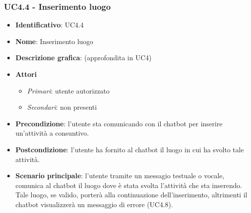 \subsubsection{UC4.4 - Inserimento luogo }
\begin{itemize}
    \item \textbf{Identificativo}: UC4.4
    \item \textbf{Nome}: Inserimento luogo   
    \item \textbf{Descrizione grafica}: (approfondita in UC4)
    \item \textbf{Attori}
        \begin{itemize} 
            \item \textit{Primari}: utente autorizzato
            \item \textit{Secondari}: non presenti
        \end{itemize}
    \item \textbf{Precondizione}: l'utente sta comunicando con il chatbot per inserire un'attività a consuntivo. 
    \item \textbf{Postcondizione}: l'utente ha fornito al chatbot il luogo in cui ha svolto tale attività. 
    \item \textbf{Scenario principale}: l'utente tramite un messagio testuale o vocale, comunica al chatbot il luogo dove è stata svolta l'attività che sta inserendo. Tale luogo, se valido, porterà alla continuazione dell'inserimento, altrimenti il chatbot visualizzerà un messaggio di errore (UC4.8). 
\end{itemize}

